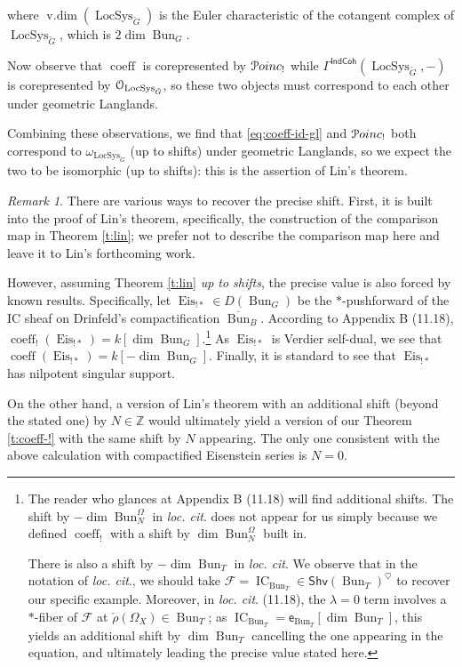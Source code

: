 \documentclass[reqno,11pt]{amsart}
\numberwithin{equation}{subsection}
\theoremstyle{remark}
\newtheorem{rem}[thm]{Remark}
\newcommand{\bZ}{{\mathbb Z}}
\newcommand{\sO}{{\EuScript O}}
\newcommand{\sP}{{\EuScript P}}
\newcommand{\on}{\operatorname}
\newcommand{\Bun}{\on{Bun}}
\newcommand{\LocSys}{\on{LocSys}}
\newcommand{\IC}{\on{IC}}
\newcommand{\IndCoh}{\mathsf{IndCoh}}
\newcommand{\coeff}{\on{coeff}}
\newcommand{\Poinc}{\sP oinc}
\newcommand{\Shv}{\mathsf{Shv}}
\newcommand{\sfe}{\mathsf{e}}
\begin{document}
\noindent where $\on{v.dim}(\LocSys_{\check{G}})$ is the 
Euler characteristic of the cotangent complex of $\LocSys_{\check{G}}$,
which is $2\dim \Bun_G$.

Now observe that $\coeff$ is corepresented by $\Poinc_!$ while 
$\Gamma^{\IndCoh}(\LocSys_{\check{G}},-)$ is corepresented
by $\sO_{\LocSys_{\check{G}}}$, so these two objects must correspond
to each other under geometric Langlands.

Combining these observations, we find that \eqref{eq:coeff-id-gl} and
$\Poinc_!$ both correspond to $\omega_{\LocSys_{\check{G}}}$ (up to shifts)
under geometric Langlands, so we expect the two to be isomorphic (up to shifts): 
this is the assertion of Lin's theorem.

\begin{rem}

There are various ways to recover the precise shift. First, it is built into
the proof of Lin's theorem, specifically, the construction of the comparison map 
in Theorem \ref{t:lin};
we prefer not to describe the comparison map here and leave it to Lin's forthcoming
work. 

However, assuming Theorem \ref{t:lin} \emph{up to shifts}, 
the precise value is also forced by known results. Specifically, let
$\on{Eis}_{!*} \in D(\Bun_G)$ be the $*$-pushforward of the IC sheaf on 
Drinfeld's compactification $\overline{\Bun}_B$.  
According to \cite{potential} Appendix B (11.18), 
$\coeff_!(\on{Eis}_{!*}) = k[\dim \Bun_G]$.\footnote{The reader who glances
at \cite{potential} Appendix B (11.18) 
will find additional shifts. The shift by $-\dim \Bun_N^{\Omega}$ in 
\emph{loc. cit}. does not appear for us simply because we defined
$\coeff_!$ with a shift by $\dim \Bun_N^{\Omega}$ built in.

There is also a shift by $-\dim\Bun_T$ in \emph{loc. cit}. 
We observe that in the notation of \emph{loc. cit}., we should take
$\mathcal{F} = \IC_{\Bun_T} \in \Shv(\Bun_T)^{\heartsuit}$ to recover our specific
example. Moreover, in \emph{loc. cit}. (11.18), 
the $\lambda = 0$ term involves a $*$-fiber of $\mathcal{F}$ 
at $\check{\rho}(\Omega_X) \in \Bun_T$;
as $\IC_{\Bun_T} = \sfe_{\Bun_T}[\dim \Bun_T]$, 
this yields an additional shift by $\dim \Bun_T$ cancelling the one
appearing in the equation, and ultimately leading the precise value
stated here.}
As $\on{Eis}_{!*}$ is Verdier self-dual, we see that 
$\coeff(\on{Eis}_{!*}) = k[-\dim\Bun_G]$. Finally, it is standard to
see that $\on{Eis}_{!*}$ has nilpotent singular support.

On the other hand, a version of Lin's theorem with an additional
shift (beyond the stated one) by $N \in \bZ$ would ultimately
yield a version of our Theorem \ref{t:coeff-!} with the same shift by $N$
appearing. The only one consistent with the above calculation with 
compactified Eisenstein series is $N = 0$.

\end{rem}
\end{document}
